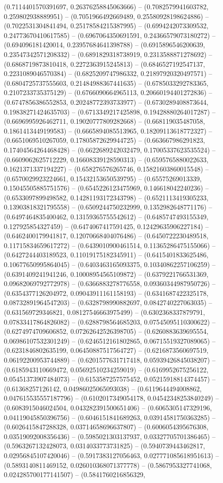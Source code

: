 (0.7114401570391697, 0.26376258845063666) -- (0.7082579941603782, 0.259802938889951) -- (0.7051966492669489, 0.25580928198624886) -- (0.7022531304841494, 0.25178584215387995) -- (0.6994242073309532, 0.24773670410617585) -- (0.6967064350691591, 0.24366579073180272) -- (0.694096181420014, 0.23957684641398788) -- (0.6915896546200639, 0.23547342571208332) -- (0.6891829318738919, 0.2313588871278692) -- (0.6868719873810418, 0.2272363915245813) -- (0.6846527192547137, 0.2231089046570384) -- (0.6825209747986332, 0.21897920320497571) -- (0.6804725737555603, 0.21484988367441635) -- (0.6785033292783365, 0.2107233735375129) -- (0.6766090664965113, 0.20660194401272836) -- (0.6747856386552853, 0.20248772393733977) -- (0.6730289408873644, 0.19838271424635703) -- (0.6713349217425898, 0.19428880264017287) -- (0.6696995926462711, 0.19020777809282668) -- (0.668119035487058, 0.1861413449199583) -- (0.6665894085513965, 0.18209113618772327) -- (0.6651069510267059, 0.17805872629944725) -- (0.663667986291823, 0.17404564264468428) -- (0.6622689242032479, 0.17005337623535524) -- (0.6609062625712229, 0.16608339128590313) -- (0.6595765880022633, 0.1621371337194227) -- (0.658276576265746, 0.15821603860015548) -- (0.6570029923224661, 0.15432153650539795) -- (0.65575269013339, 0.15045505885751576) -- (0.6545226123475969, 0.146618042240236) -- (0.6533097899498582, 0.14281193172343798) -- (0.6521113419305233, 0.13903818321795558) -- (0.6509244750232999, 0.1352982648771176) -- (0.6497464835400462, 0.13159365755542612) -- (0.6485747493155349, 0.127925854327459) -- (0.6474067417591425, 0.12429635906227184) -- (0.6462400179941817, 0.12070668404076486) -- (0.6450722230489518, 0.11715834659617272) -- (0.6439010900461514, 0.11365286475155066) -- (0.6427244403189523, 0.11019175182345911) -- (0.6415401833625486, 0.10677650995864045) -- (0.6403463165093375, 0.10340862257106259) -- (0.6391409241941246, 0.10008954565109872) -- (0.6379221766531369, 0.09682069792772978) -- (0.6366883278776558, 0.09360344987950726) -- (0.6354377126204972, 0.09043911161158193) -- (0.6341687422325178, 0.08732891964547203) -- (0.6328798990882697, 0.0842740227063035) -- (0.631569729346821, 0.08127546663975499) -- (0.6302368337879791, 0.07833417864826082) -- (0.6288798564685203, 0.07545095110300622) -- (0.6274974709606852, 0.07262642526398705) -- (0.6260883639695554, 0.06986107532301249) -- (0.6246512161802865, 0.06715519327089065) -- (0.6231846802635199, 0.06450887517564727) -- (0.6216873560697519, 0.06192200953744889) -- (0.6201577631717418, 0.05939426845038207) -- (0.6185943110669472, 0.05692510234259019) -- (0.6169952675256122, 0.05451373907484073) -- (0.6153587257575452, 0.05215918814374457) -- (0.61368257126142, 0.04986025065093038) -- (0.6119644494008862, 0.047615535557187796) -- (0.6102017349054178, 0.04542348253840249) -- (0.6083915046024504, 0.043282391500651406) -- (0.6065305147329196, 0.04119045850396756) -- (0.6046151841689263, 0.03914581750363285) -- (0.6026415847288328, 0.03714658696637807) -- (0.6006054395676308, 0.03519092008356436) -- (0.5985021303137937, 0.03327705701386465) -- (0.5963267132428073, 0.0314033773731825) -- (0.5940739443462817, 0.02956845107420046) -- (0.5917383127056463, 0.027771085618951613) -- (0.5893140811469152, 0.026010368071377778) -- (0.5867953327741068, 0.024285700177141507) -- (0.5841760216856329, 